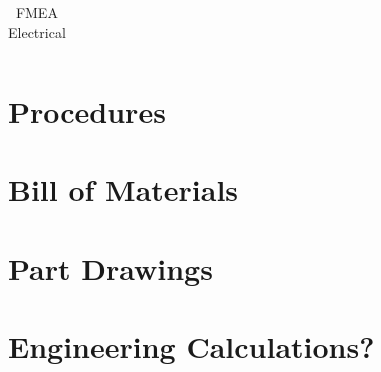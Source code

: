 \documentclass[hidelinks, twoside]{report}
\begin{document}
\begin{appendices}
\begin{table}
\begin{tabular}{@{}p{2cm}p{2cm}p{3cm}p{1cm}p{3cm}p{3cm}@{}}
    
    
     \bottomrule
  \end{tabular}
  \caption{FMEA Electrical}
  \label{table:fmea-electrical}
\end{table}

\chapter{Procedures}
        \chapter{Bill of Materials}
        \label{app:bom}
        
        \chapter{Part Drawings}
        \chapter{Engineering Calculations?}
    \end{appendices}
\end{document}
